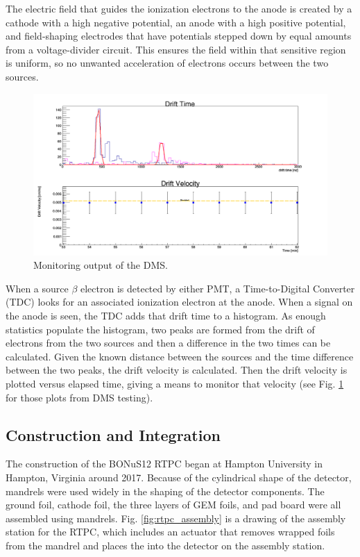 The electric field that guides the ionization electrons to the anode is created by a cathode with a high negative potential, an anode with a high positive potential, and field-shaping electrodes that have potentials stepped down by equal amounts from a voltage-divider circuit. This ensures the field within that sensitive region is uniform, so no unwanted acceleration of electrons occurs between the two sources.

\begin{figure}[h!]
	\centering
	\includegraphics[width=0.8\linewidth]{figures/dms_gui.png}
	\caption{Monitoring output of the DMS.}
	\label{fig:dms_gui}
\end{figure}

When a source $\beta$ electron is detected by either PMT, a Time-to-Digital Converter (TDC) looks for an associated ionization electron at the anode. When a signal on the anode is seen, the TDC adds that drift time to a histogram. As enough statistics populate the histogram, two peaks are formed from the drift of electrons from the two sources and then a difference in the two times can be calculated. Given the known distance between the sources and the time difference between the two peaks, the drift velocity is calculated. Then the drift velocity is plotted versus elapsed time, giving a means to monitor that velocity (see Fig. \ref{fig:dms_gui} for those plots from DMS testing).

\newpage
\subsection{Construction and Integration}
The construction of the BONuS12 RTPC began at Hampton University in Hampton, Virginia around 2017. Because of the cylindrical shape of the detector, mandrels were used widely in the shaping of the detector components. The ground foil, cathode foil, the three layers of GEM foils, and pad board were all assembled using mandrels. Fig. \ref{fig:rtpc_assembly} is a drawing of the assembly station for the RTPC, which includes an actuator that removes wrapped foils from the mandrel and places the into the detector on the assembly station.

